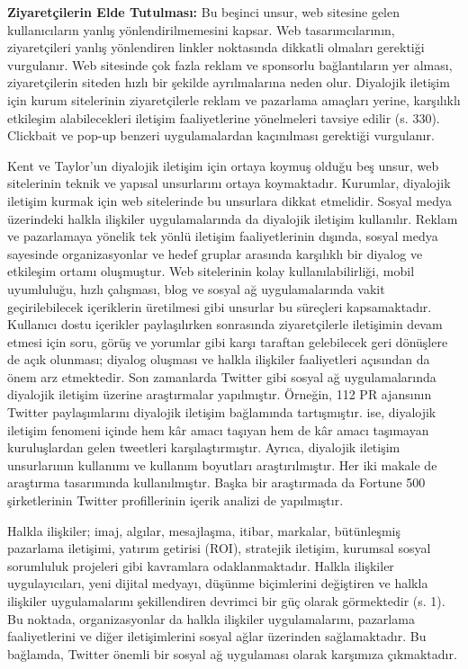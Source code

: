 \documentclass[
]{book}
\begin{document}
\textbf{Ziyaretçilerin Elde Tutulması:} Bu beşinci unsur, web sitesine gelen kullanıcıların yanlış yönlendirilmemesini kapsar. Web tasarımcılarının, ziyaretçileri yanlış yönlendiren linkler noktasında dikkatli olmaları gerektiği vurgulanır. Web sitesinde çok fazla reklam ve sponsorlu bağlantıların yer alması, ziyaretçilerin siteden hızlı bir şekilde ayrılmalarına neden olur. Diyalojik iletişim için kurum sitelerinin ziyaretçilerle reklam ve pazarlama amaçları yerine, karşılıklı etkileşim alabilecekleri iletişim faaliyetlerine yönelmeleri tavsiye edilir (s. 330). \citep{kent1998building} Clickbait ve pop-up benzeri uygulamalardan kaçınılması gerektiği vurgulanır.

Kent ve Taylor'un diyalojik iletişim için ortaya koymuş olduğu beş unsur, web sitelerinin teknik ve yapısal unsurlarını ortaya koymaktadır. Kurumlar, diyalojik iletişim kurmak için web sitelerinde bu unsurlara dikkat etmelidir. Sosyal medya üzerindeki halkla ilişkiler uygulamalarında da diyalojik iletişim kullanılır. Reklam ve pazarlamaya yönelik tek yönlü iletişim faaliyetlerinin dışında, sosyal medya sayesinde organizasyonlar ve hedef gruplar arasında karşılıklı bir diyalog ve etkileşim ortamı oluşmuştur. Web sitelerinin kolay kullanılabilirliği, mobil uyumluluğu, hızlı çalışması, blog ve sosyal ağ uygulamalarında vakit geçirilebilecek içeriklerin üretilmesi gibi unsurlar bu süreçleri kapsamaktadır. Kullanıcı dostu içerikler paylaşılırken sonrasında ziyaretçilerle iletişimin devam etmesi için soru, görüş ve yorumlar gibi karşı taraftan gelebilecek geri dönüşlere de açık olunması; diyalog oluşması ve halkla ilişkiler faaliyetleri açısından da önem arz etmektedir.
Son zamanlarda Twitter gibi sosyal ağ uygulamalarında diyalojik iletişim üzerine araştırmalar yapılmıştır. Örneğin, \citet{thelen2021dialogic} 112 PR ajansının Twitter paylaşımlarını diyalojik iletişim bağlamında tartışmıştır. \citet{wang2020dialogic} ise, diyalojik iletişim fenomeni içinde hem kâr amacı taşıyan hem de kâr amacı taşımayan kuruluşlardan gelen tweetleri karşılaştırmıştır. Ayrıca, diyalojik iletişim unsurlarının kullanımı ve kullanım boyutları araştırılmıştır. Her iki makale de araştırma tasarımında kullanılmıştır. Başka bir araştırmada da Fortune 500 şirketlerinin Twitter profillerinin içerik analizi de yapılmıştır. \citep{rybalko2010dialogic}

Halkla ilişkiler; imaj, algılar, mesajlaşma, itibar, markalar, bütünleşmiş pazarlama iletişimi, yatırım getirisi (ROI), stratejik iletişim, kurumsal sosyal sorumluluk projeleri gibi kavramlara odaklanmaktadır. Halkla ilişkiler uygulayıcıları, yeni dijital medyayı, düşünme biçimlerini değiştiren ve halkla ilişkiler uygulamalarını şekillendiren devrimci bir güç olarak görmektedir (s. 1). \citep{grunig2009paradigms} Bu noktada, organizasyonlar da halkla ilişkiler uygulamalarını, pazarlama faaliyetlerini ve diğer iletişimlerini sosyal ağlar üzerinden sağlamaktadır. Bu bağlamda, Twitter önemli bir sosyal ağ uygulaması olarak karşımıza çıkmaktadır.
\end{document}
